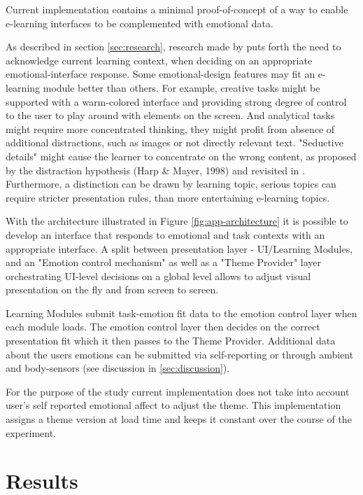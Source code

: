 Current implementation contains a minimal proof-of-concept of a way to enable e-learning interfaces to be complemented with emotional data. 

As described in section \ref{sec:research}, research made by \cite{Haaranen2015} puts forth the need to acknowledge current learning context, when deciding on an appropriate emotional-interface response.
Some emotional-design features may fit an e-learning module better than others.
For example, creative tasks might be supported with a warm-colored interface and providing strong degree of control to the user to play around with elements on the screen. 
And analytical tasks might require more concentrated thinking, they might profit from absence of additional distractions, such as images or not directly relevant text. "Seductive details" might cause the learner to concentrate on the wrong content, as proposed by the distraction hypothesis (Harp \& Mayer, 1998) and revisited in \cite{Chang2014}.
Furthermore, a distinction can be drawn by learning topic, serious topics can require stricter presentation rules, than more entertaining e-learning topics.


With the architecture illustrated in Figure \ref{fig:app-architecture} it is possible to develop an interface that responds to emotional and task contexts with an appropriate interface. A split between presentation layer - UI/Learning Modules, and an "Emotion control mechanism" as well as a "Theme Provider" layer orchestrating UI-level decisions on a global level allows to adjust visual presentation on the fly and from screen to screen.

Learning Modules submit task-emotion fit data to the emotion control layer when each module loads. The emotion control layer then decides on the correct presentation fit which it then passes to the Theme Provider. Additional data about the users emotions can be submitted via self-reporting or through ambient and body-sensors (see discussion in \ref{sec:discussion}). 

For the purpose of the study current implementation does not take into account user's self reported emotional affect to adjust the theme. This implementation assigns a theme version at load time and keeps it constant over the course of the experiment.

\section{Results}

